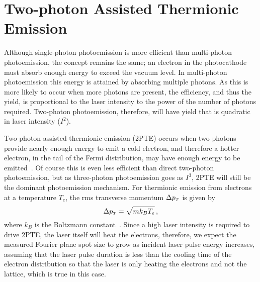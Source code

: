 
\section{Two-photon Assisted Thermionic Emission} \label{sec:two_photon_thermionic}

Although single-photon photoemission is more efficient than multi-photon photoemission, the concept remains the same; an electron in the photocathode must absorb enough energy to exceed the vacuum level.
In multi-photon photoemission this energy is attained by absorbing multiple photons.
As this is more likely to occur when more photons are present, the efficiency, and thus the yield, is proportional to the laser intensity to the power of the number of photons required.
Two-photon photoemission, therefore, will have yield that is quadratic in laser intensity ($I^2$).

Two-photon assisted thermionic emission (2PTE) occurs when two photons provide nearly enough energy to emit a cold electron, and therefore a hotter electron, in the tail of the Fermi distribution, may have enough energy to be emitted~\cite{yen_thermally_1980}.
Of course this is even less efficient than direct two-photon photoemission, but as three-photon photoemission goes as $I^3$, 2PTE will still be the dominant photoemission mechanism.
For thermionic emission from electrons at a temperature $T_e$, the rms transverse momentum $\Delta p_{{\scriptscriptstyle T}}$ is given by 
\begin{equation}
  \Delta p_{{\scriptscriptstyle T}} = \sqrt{m k_B T_e} \,\text{,}
\end{equation}
where $k_B$ is the Boltzmann constant~\cite{dowell_quantum_2009,jensen_emittance_2010}.
Since a high laser intensity is required to drive 2PTE, the laser itself will heat the electrons, therefore, we expect the measured Fourier plane spot size to grow as incident laser pulse energy increases, assuming that the laser pulse duration is less than the cooling time of the electron distribution so that the laser is only heating the electrons and not the lattice, which is true in this case.

